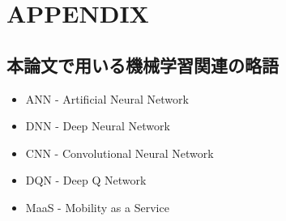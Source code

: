 \appendix
\chapter{APPENDIX}


\section{本論文で用いる機械学習関連の略語}


\begin{itemize}
    \item ANN - Artificial Neural Network
    \item DNN - Deep Neural Network
    \item CNN - Convolutional Neural Network
    \item DQN - Deep Q Network
    \item MaaS - Mobility as a Service
\end{itemize}